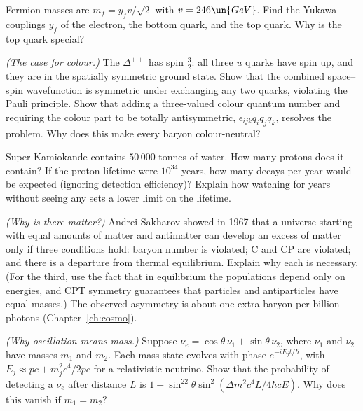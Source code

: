 \begin{problems}
 Fermion masses are $m_f = y_fv/\sqrt2$ with $v = 246\un{GeV}$. Find the Yukawa couplings $y_f$ of the electron, the bottom quark, and the top quark. Why is the top quark special?

\core \label{prob:colour} \emph{(The case for colour.)} The $\Delta^{++}$ has spin $\tfrac32$: all three $u$ quarks have spin up, and they are in the spatially symmetric ground state. Show that the combined space--spin wavefunction is symmetric under exchanging any two quarks, violating the Pauli principle. Show that adding a three-valued colour quantum number and requiring the colour part to be totally antisymmetric, $\epsilon_{ijk}q_iq_jq_k$, resolves the problem. Why does this make every baryon colour-neutral?

 \label{prob:proton-decay} Super-Kamiokande contains $50\,000$ tonnes of water. How many protons does it contain? If the proton lifetime were $10^{34}$ years, how many decays per year would be expected (ignoring detection efficiency)? Explain how watching for years without seeing any sets a lower limit on the lifetime.

 \label{prob:sakharov} \emph{(Why is there matter?)} Andrei Sakharov showed in 1967 that a universe starting with equal amounts of matter and antimatter can develop an excess of matter only if three conditions hold: baryon number is violated; C and CP are violated; and there is a departure from thermal equilibrium. Explain why each is necessary. (For the third, use the fact that in equilibrium the populations depend only on energies, and CPT symmetry guarantees that particles and antiparticles have equal masses.) The observed asymmetry is about one extra baryon per billion photons (Chapter~\ref{ch:cosmo}).

 \label{prob:oscillation} \emph{(Why oscillation means mass.)} Suppose $\nu_e = \cos\theta\,\nu_1 + \sin\theta\,\nu_2$, where $\nu_1$ and $\nu_2$ have masses $m_1$ and $m_2$. Each mass state evolves with phase $e^{-iE_jt/\hbar}$, with $E_j\approx pc + m_j^2c^4/2pc$ for a relativistic neutrino. Show that the probability of detecting a $\nu_e$ after distance $L$ is $1 - \sin^22\theta\sin^2(\Delta m^2c^4L/4\hbar cE)$. Why does this vanish if $m_1 = m_2$?
\end{problems}

\begin{reading}
\end{reading}
